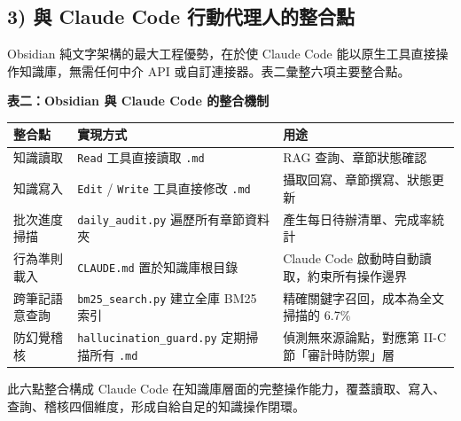 \subsection{3) 與 Claude Code
行動代理人的整合點}\label{ux8207-claude-code-ux884cux52d5ux4ee3ux7406ux4ebaux7684ux6574ux5408ux9ede}

Obsidian 純文字架構的最大工程優勢，在於使 Claude Code
能以原生工具直接操作知識庫，無需任何中介 API
或自訂連接器。表二彙整六項主要整合點。

\textbf{表二：Obsidian 與 Claude Code 的整合機制}

{\def\LTcaptype{none} %
\begin{longtable}[]{@{}
  >{\raggedright\arraybackslash}p{}
  >{\raggedright\arraybackslash}p{}
  >{\raggedright\arraybackslash}p{}@{}}
\toprule\noalign{}
\begin{minipage}[b]{\linewidth}\raggedright
整合點
\end{minipage} & \begin{minipage}[b]{\linewidth}\raggedright
實現方式
\end{minipage} & \begin{minipage}[b]{\linewidth}\raggedright
用途
\end{minipage} \\
\midrule\noalign{}
\endhead
\bottomrule\noalign{}
\endlastfoot
知識讀取 & \texttt{Read} 工具直接讀取 \texttt{.md} & RAG
查詢、章節狀態確認 \\
知識寫入 & \texttt{Edit} / \texttt{Write} 工具直接修改 \texttt{.md} &
攝取回寫、章節撰寫、狀態更新 \\
批次進度掃描 & \texttt{daily\_audit.py} 遍歷所有章節資料夾 &
產生每日待辦清單、完成率統計 \\
行為準則載入 & \texttt{CLAUDE.md} 置於知識庫根目錄 & Claude Code
啟動時自動讀取，約束所有操作邊界 \\
跨筆記語意查詢 & \texttt{bm25\_search.py} 建立全庫 BM25 索引 &
精確關鍵字召回，成本為全文掃描的 6.7\% \\
防幻覺稽核 & \texttt{hallucination\_guard.py} 定期掃描所有 \texttt{.md}
& 偵測無來源論點，對應第 II-C 節「審計時防禦」層 \\
\end{longtable}
}

此六點整合構成 Claude Code
在知識庫層面的完整操作能力，覆蓋讀取、寫入、查詢、稽核四個維度，形成自給自足的知識操作閉環。

